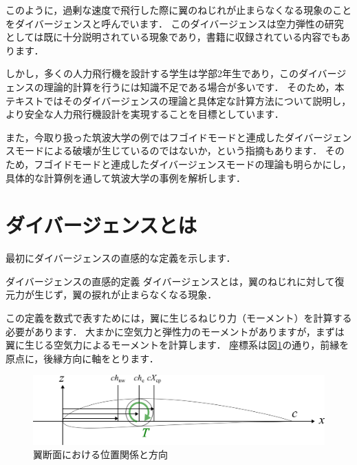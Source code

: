 \documentclass{jarticle}
\begin{document}
このように，過剰な速度で飛行した際に翼のねじれが止まらなくなる現象のことをダイバージェンスと呼んでいます．
このダイバージェンスは空力弾性の研究としては既に十分説明されている現象であり，書籍に収録されている内容でもあります\cite{2019}．

しかし，多くの人力飛行機を設計する学生は学部2年生であり，このダイバージェンスの理論的計算を行うには知識不足である場合が多いです．
そのため，本テキストではそのダイバージェンスの理論と具体定な計算方法について説明し，より安全な人力飛行機設計を実現することを目標としています．

また，今取り扱った筑波大学の例ではフゴイドモードと連成したダイバージェンスモード\cite{takasaki}による破壊が生じているのではないか，という指摘もあります．
そのため，フゴイドモードと連成したダイバージェンスモードの理論も明らかにし，具体的な計算例を通して筑波大学の事例を解析します．

\newpage

\section{ダイバージェンスとは}

最初にダイバージェンスの直感的な定義を示します．
\begin{itembox}[l]{ダイバージェンスの直感的定義}
    ダイバージェンスとは，翼のねじれに対して復元力が生じず，翼の捩れが止まらなくなる現象．
\end{itembox}

この定義を数式で表すためには，翼に生じるねじり力（モーメント）を計算する必要があります．
大まかに空気力と弾性力のモーメントがありますが，まずは翼に生じる空気力によるモーメントを計算します．
座標系は図\ref{chod}の通り，前縁を原点に，後縁方向に軸をとります．
\begin{figure}[H]
    \centering
    \includegraphics[width=0.7\linewidth]{image/airfoil.pdf}
    \caption{翼断面における位置関係と方向}
    \label{chod}
\end{figure}
\end{document}
